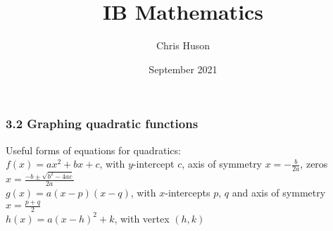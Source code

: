 \documentclass[12pt, twoside]{article}
\title{IB Mathematics}
\author{Chris Huson}
\date{September 2021}
\begin{document}
\subsubsection*{3.2 Graphing quadratic functions}
Useful forms of equations for quadratics:\\[0.25cm] 
$f(x)=ax^2 + bx+c$, with $y$-intercept $c$, axis of symmetry $\displaystyle x=-\frac{b}{2a}$, zeros $\displaystyle x=\frac{-b \pm \sqrt{b^2-4ac}}{2a}$\\[0.25cm]
$g(x)=a(x-p)(x-q)$, with $x$-intercepts $p$, $q$ and axis of symmetry $\displaystyle x=\frac{p+q}{2}$\\[0.25cm] 
$h(x)=a(x-h)^2+k$, with vertex $(h,k)$
\vspace{0.5cm}
\end{document}
